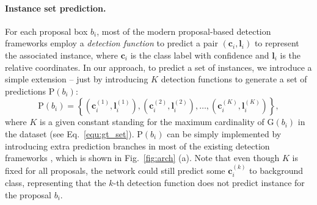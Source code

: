 \documentclass[10pt,twocolumn,letterpaper]{article}
\begin{document}
\paragraph{Instance set prediction. }
For each proposal box $b_i$, most of the modern proposal-based detection frameworks \cite{ren2015faster,lin2017feature,lin2017focal,liu2016ssd,he2017mask} employ a \emph{detection function} to predict a pair $(\mathbf{c}_i, \mathbf{l}_i)$ to represent the associated instance, where $\mathbf{c}_i$ is the class label with confidence and $\mathbf{l}_i$ is the relative coordinates. In our approach, to predict a set of instances, we introduce a simple extension -- just by introducing $K$ detection functions to generate a set of predictions $\mathrm{P}(b_i)$:
\begin{equation}
\mathrm{P}(b_i) = \left\{ (\mathbf{c}_i^{(1)}, \mathbf{l}_i^{(1)}),  (\mathbf{c}_i^{(2)}, \mathbf{l}_i^{(2)}), \dots ,  (\mathbf{c}_i^{(K)}, \mathbf{l}_i^{(K)}) \right\}, 
\label{equ:pred}
\end{equation}
where $K$ is a given constant standing for the maximum cardinality of $\mathrm{G}(b_i)$ in the dataset (see Eq.~\ref{equ:gt_set}). $\mathrm{P}(b_i)$ can be simply implemented by introducing extra prediction branches in most of the existing detection frameworks \cite{ren2015faster,lin2017feature,lin2017focal,he2017mask,liu2016ssd}, which is shown in Fig.~\ref{fig:arch} (a). Note that even though $K$ is fixed for all proposals, the network could still predict some $\mathbf{c}_i^{(k)}$ to background class, representing that the $k$-th detection function does not predict instance for the proposal $b_i$.
\end{document}

